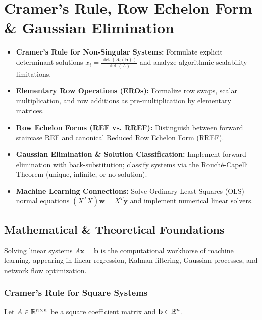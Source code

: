 \chapter{Cramer's Rule, Row Echelon Form \& Gaussian Elimination}

\begin{tcolorbox}[colback=primarylight, colframe=primarydark, title={\textbf{Executive Roadmap \& Learning Objectives}}]
\begin{itemize}
    \item \textbf{Cramer's Rule for Non-Singular Systems:} Formulate explicit determinant solutions $x_i = \frac{\det(A_i(\mathbf{b}))}{\det(A)}$ and analyze algorithmic scalability limitations.
    \item \textbf{Elementary Row Operations (EROs):} Formalize row swaps, scalar multiplication, and row additions as pre-multiplication by elementary matrices.
    \item \textbf{Row Echelon Forms (REF vs. RREF):} Distinguish between forward staircase REF and canonical Reduced Row Echelon Form (RREF).
    \item \textbf{Gaussian Elimination \& Solution Classification:} Implement forward elimination with back-substitution; classify systems via the Rouché-Capelli Theorem (unique, infinite, or no solution).
    \item \textbf{Machine Learning Connections:} Solve Ordinary Least Squares (OLS) normal equations $(X^T X)\mathbf{w} = X^T \mathbf{y}$ and implement numerical linear solvers.
\end{itemize}
\end{tcolorbox}

\section{Mathematical \& Theoretical Foundations}

Solving linear systems $A\mathbf{x} = \mathbf{b}$ is the computational workhorse of machine learning, appearing in linear regression, Kalman filtering, Gaussian processes, and network flow optimization.

\subsection{Cramer's Rule for Square Systems}

Let $A \in \mathbb{R}^{n \times n}$ be a square coefficient matrix and $\mathbf{b} \in \mathbb{R}^n$.

